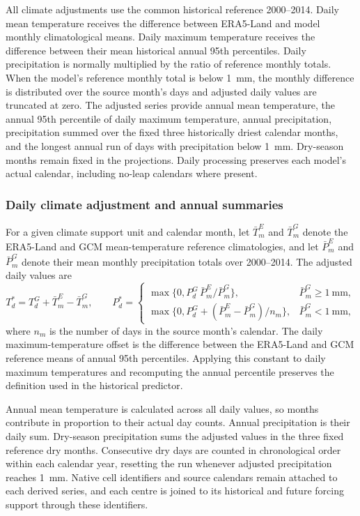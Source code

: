 All climate adjustments use the common historical reference 2000--2014. Daily mean temperature receives the difference between ERA5-Land and model monthly climatological means. Daily maximum temperature receives the difference between their mean historical annual 95th percentiles. Daily precipitation is normally multiplied by the ratio of reference monthly totals. When the model's reference monthly total is below 1~mm, the monthly difference is distributed over the source month's days and adjusted daily values are truncated at zero. The adjusted series provide annual mean temperature, the annual 95th percentile of daily maximum temperature, annual precipitation, precipitation summed over the fixed three historically driest calendar months, and the longest annual run of days with precipitation below 1~mm. Dry-season months remain fixed in the projections. Daily processing preserves each model's actual calendar, including no-leap calendars where present.

\subsubsection{Daily climate adjustment and annual summaries}
For a given climate support unit and calendar month, let $\bar T^E_m$ and $\bar T^G_m$ denote the ERA5-Land and GCM mean-temperature reference climatologies, and let $\bar P^E_m$ and $\bar P^G_m$ denote their mean monthly precipitation totals over 2000--2014. The adjusted daily values are
\[
T^*_{d}=T^G_{d}+\bar T^E_m-\bar T^G_m,
\qquad
P^*_{d}=
\begin{cases}
\max\{0,P^G_d\,\bar P^E_m/\bar P^G_m\}, & \bar P^G_m\geq1~\mathrm{mm},\\
\max\{0,P^G_d+(\bar P^E_m-\bar P^G_m)/n_m\}, & \bar P^G_m<1~\mathrm{mm},
\end{cases}
\]
where $n_m$ is the number of days in the source month's calendar. The daily maximum-temperature offset is the difference between the ERA5-Land and GCM reference means of annual 95th percentiles. Applying this constant to daily maximum temperatures and recomputing the annual percentile preserves the definition used in the historical predictor.

Annual mean temperature is calculated across all daily values, so months contribute in proportion to their actual day counts. Annual precipitation is their daily sum. Dry-season precipitation sums the adjusted values in the three fixed reference dry months. Consecutive dry days are counted in chronological order within each calendar year, resetting the run whenever adjusted precipitation reaches 1~mm. Native cell identifiers and source calendars remain attached to each derived series, and each centre is joined to its historical and future forcing support through these identifiers.


